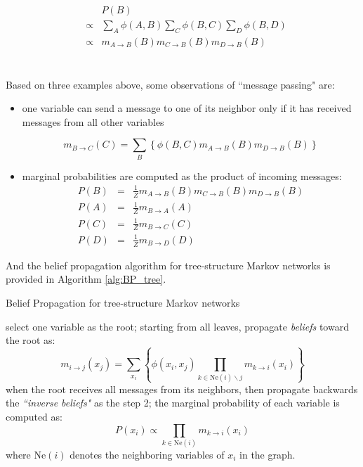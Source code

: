 \begin{minipage}[c]{0.6\textwidth}
 \begin{equation*}
  \begin{array}{rcl}
  & & P(B) \\
  &\propto& \sum_{A}\phi(A,B) \sum_C \phi(B,C) \sum_D \phi(B,D)\\  
  &\propto& m_{A\rightarrow B}(B) m_{C\rightarrow B} (B) m_{D\rightarrow B}(B)  \\
  \end{array}
 \end{equation*}
\end{minipage}\\

Based on three examples above, some observations of ``message passing" are:  
\begin{itemize}
	\item  one variable can send a message to one of its neighbor only if it has received messages from all other variables  

  \begin{equation*}
   m_{B\rightarrow C}(C)=\sum_{B} \left\{   \phi(B,C) m_{A\rightarrow B}(B) m_{D\rightarrow B}(B) \right\}
  \end{equation*}

 \item marginal probabilities are computed as the product of incoming messages:
  \begin{equation*}
  \begin{array}{rcl}
   P(B)&=&\frac{1}{Z}m_{A\rightarrow B}(B) m_{C\rightarrow B} (B) m_{D\rightarrow B}(B)\\
   P(A)&=&\frac{1}{Z}m_{B\rightarrow A}(A) \\
   P(C)&=&\frac{1}{Z}m_{B\rightarrow C}(C) \\
   P(D)&=&\frac{1}{Z}m_{B\rightarrow D}(D) 
  \end{array}
 \end{equation*}
\end{itemize}
And the belief propagation algorithm for tree-structure Markov networks is provided in Algorithm \ref{alg:BP_tree}.       
\begin{algorithm}
	\caption{Belief Propagation for tree-structure Markov networks}
	\label{alg:BP_tree}
\begin{algorithmic}[1]
\STATE  select one variable as the root; 
\STATE  starting from all leaves, propagate \emph{beliefs} toward the root as:
\begin{equation*}
m_{i \rightarrow j}(x_j)= \sum_{x_i}\left\{\phi(x_i,x_j) \prod_{k\in \text{Ne}(i)\backslash j} m_{k \rightarrow i}(x_i)\right\}
\end{equation*}
\STATE  when the root receives all messages from its neighbors, then propagate backwards the \emph{``inverse beliefs"} as the step 2;
\STATE  the marginal probability of each variable is computed as: 
\begin{equation*}
P(x_i)\propto \prod_{k\in \text{Ne}(i)} m_{k \rightarrow i}(x_i)
\end{equation*}
where Ne$(i)$ denotes the neighboring variables of $x_i$ in the graph. 
\end{algorithmic}
\end{algorithm}
